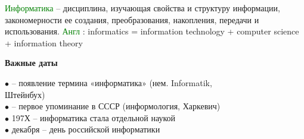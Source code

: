 \newpage
\rhead{\textbf{\textcolor{blue}{О}\textcolor{gray}{пределение термина  «информатика»}}}
\vspace*{4mm}

\textcolor{Green}{Информатика}
– дисциплина, изучающая свойства и структуру информации,
закономерности ее создания, преобразования, накопления, передачи и
использования.
\newline
\textcolor{Green}{Англ}
: informatics = information technology + computer science + information
theory

\vspace*{5mm}
\begin{center}
\textbf{Важные даты}
\end{center}
$\bullet$   – появление термина «информатика» (нем. Informatik, \\
\qquad Штейнбух) \\
$\bullet$   – первое упоминание в СССР (информология, Харкевич) \\
$\bullet$  \quad 197Х – информатика стала отдельной наукой \\
$\bullet$   декабря – день российской информатики

